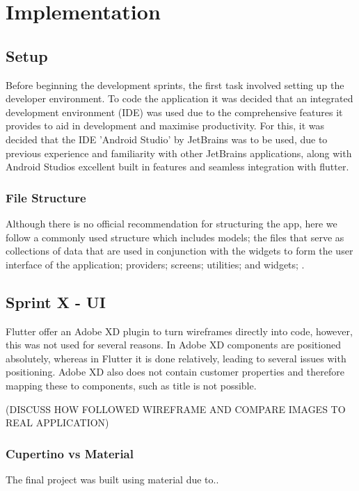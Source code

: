\documentclass[12pt]{article}
\begin{document}
	\section{Implementation}
	\subsection{Setup}
	Before beginning the development sprints, the first task involved setting up the developer environment. To code the application it was decided that an integrated development environment (IDE) was used due to the comprehensive features it provides to aid in development and maximise productivity. For this, it was decided that the IDE 'Android Studio' by JetBrains \cite{DownloadAndroidStudio} was to be used, due to previous experience and familiarity with other JetBrains applications, along with Android Studios excellent built in features and seamless integration with flutter.


	\subsubsection{File Structure}
	Although there is no official recommendation for structuring the app, here we follow a commonly used structure which includes models; the files that serve as collections of data that are used in conjunction with the widgets to form the user interface of the application; providers; screens; utilities; and widgets; .
	
	
	
	\subsection{Sprint X - UI}
	Flutter offer an Adobe XD plugin to turn wireframes directly into code, however, this was not used for several reasons. In Adobe XD components are positioned absolutely, whereas in Flutter it is done relatively, leading to several issues with positioning. Adobe XD also does not contain customer properties and therefore mapping these to components, such as title is not possible.
	
	(DISCUSS HOW FOLLOWED WIREFRAME AND COMPARE IMAGES TO REAL APPLICATION)
	
	\subsubsection{Cupertino vs Material}
	The final project was built using material due to..
	
\end{document}
